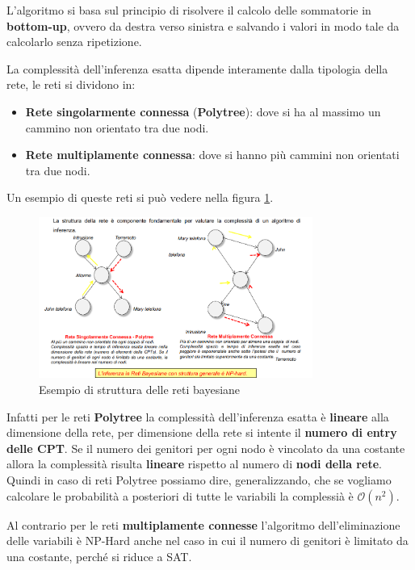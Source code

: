 L'algoritmo si basa sul principio di risolvere il calcolo delle sommatorie in
\textbf{bottom-up}, ovvero da destra verso sinistra e salvando i valori in modo
tale da calcolarlo senza ripetizione. 

La complessità dell'inferenza esatta dipende interamente dalla tipologia della rete,
le reti si dividono in:
\begin{itemize}
    \item \textbf{Rete singolarmente connessa} (\textbf{Polytree}): dove si ha
          al massimo un cammino non orientato tra due nodi.
    \item \textbf{Rete multiplamente connessa}: dove si hanno più cammini non
          orientati tra due nodi.
\end{itemize}

Un esempio di queste reti si può vedere nella figura \ref{fig:struttura_reti}.

\begin{figure}[!ht]
    \centering
    \includegraphics[width=0.8\textwidth]{img/Reti/struttura_reti_bayesiane.png}
    \caption{Esempio di struttura delle reti bayesiane}
    \label{fig:struttura_reti}
\end{figure}

Infatti per le reti \textbf{Polytree} la complessità dell'inferenza esatta è \textbf{lineare} 
alla dimensione della rete, per dimensione della rete si intente il \textbf{numero di entry 
delle CPT}. Se il numero dei genitori per ogni nodo è vincolato da una costante allora 
la complessità risulta \textbf{lineare} rispetto al numero di \textbf{nodi della rete}.
Quindi in caso di reti Polytree possiamo dire, generalizzando, che se vogliamo calcolare 
le probabilità a posteriori di tutte le variabili la complessià è $\mathcal{O}(n^2)$.

Al contrario per le reti \textbf{multiplamente connesse} l'algoritmo dell'eliminazione 
delle variabili è NP-Hard anche nel caso in cui il numero di genitori è limitato 
da una costante, perché si riduce a SAT.

